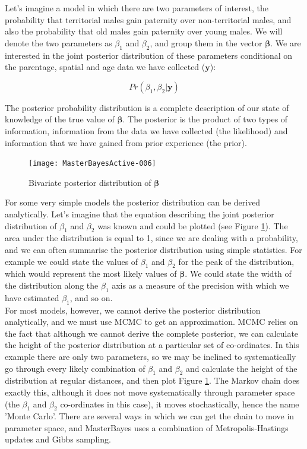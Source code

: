 \documentclass{article}
\begin{document}
Let's imagine a model in which there are two parameters of interest, the probability that territorial males gain paternity over non-territorial males, and also the probability that old males gain paternity over young males.  We will denote the two parameters as $\beta_{1}$ and  $\beta_{2}$, and group them in the vector $\bm{\beta}$.   We are interested in the joint posterior distribution of these parameters conditional on the parentage, spatial and age data we have collected ($\bm{y}$):

\begin{equation}
Pr(\beta_{1}, \beta_{2} | \bm{y})
\end{equation}

The posterior probability distribution is a complete description of our state of knowledge of the true value of $\bm{\beta}$. The posterior is the product of two types of information, information from the data we have collected (the likelihood) and information that we have gained from prior experience (the prior).\\  



\begin{figure}[!h]
\begin{center}
\texttt{[image: MasterBayesActive-006]}
\end{center}
\caption{Bivariate posterior distribution of $\bm{\beta}$}
\label{densityP}
\end{figure}

For some very simple models the posterior distribution can be derived analytically. Let's imagine that the equation describing the joint posterior distribution of $\beta_{1}$ and $\beta_{2}$ was known and could be plotted (see Figure \ref{densityP}).  The area under the distribution is equal to 1, since we are dealing with a probability, and we can often summarise the posterior distribution using simple statistics.  For example we could state the values of $\beta_{1}$ and $\beta_{2}$ for the peak of the distribution, which would represent the most likely values of $\bm{\beta}$.  We could state the width of the distribution along the $\beta_{1}$ axis as a measure of the precision with which we have estimated $\beta_{1}$, and so on.\\

For most models, however, we cannot derive the posterior distribution analytically, and we must use MCMC to get an approximation.  MCMC relies on the fact that although we cannot derive the complete posterior, we can calculate the height of the posterior distribution at a particular set of co-ordinates. In this example there are only two parameters, so we may be inclined to systematically go through every likely combination of $\beta_{1}$ and $\beta_{2}$ and calculate the height of the distribution at regular distances, and then plot Figure \ref{densityP}.  The Markov chain does exactly this, although it does not move systematically through parameter space (the $\beta_{1}$ and $\beta_{2}$ co-ordinates in this case), it moves stochastically, hence the name 'Monte Carlo'.  There are several ways in which we can get the chain to move in parameter space, and MasterBayes uses a combination of Metropolis-Hastings updates and Gibbs sampling.\\   
\end{document}
